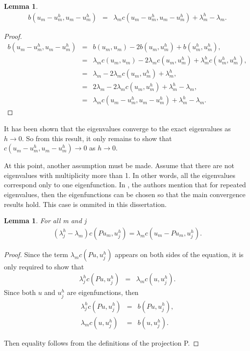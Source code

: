 \documentclass[../../main.tex]{subfiles}
\begin{document}
\newtheorem{Lem_5}[Lem_1]{Lemma} 
\begin{Lem_5}
	\label{Lem_5}
	\begin{eqnarray*}
		b(u_{m}-u_{m}^{h},u_{m}-u_{m}^{h}) &=& \lambda_{m}c( u_{m}-u_{m}^{h},u_{m}-u_{m}^{h} ) + \lambda_{m}^{h} - \lambda_{m}.
		\end{eqnarray*}
\end{Lem_5}
\begin{proof}
	\begin{eqnarray*}
		b(u_{m}-u_{m}^{h},u_{m}-u_{m}^{h}) &=& b(u_{m},u_{m}) - 2b(u_{m},u^{h}_{m}) + b(u^{h}_{m},u^{h}_{m}), \\
										&=& \lambda_{m} c( u_{m}, u_{m} ) - 2\lambda_{m} c( u_{m}, u^{h}_{m} ) + \lambda_{m}^{h}c( u_{m}^{h},u_{m}^{h} ),\\
										&=&  \lambda_{m} - 2\lambda_{m} c( u_{m}, u^{h}_{m} ) + \lambda_{m}^{h}, \\
										&=& 2\lambda_{m} - 2\lambda_{m} c( u_{m}, u^{h}_{m} ) + \lambda_{m}^{h} - \lambda_{m},\\
										&=& \lambda_{m}c( u_{m}-u_{m}^{h},u_{m}-u_{m}^{h}) + \lambda_{m}^{h} - \lambda_{m}.
		\end{eqnarray*}
\end{proof}

It has been shown that the eigenvalues converge to the exact eigenvalues as $h \rightarrow 0$. So from this result, it only remains to show that $c( u_{m}-u_{m}^{h},u_{m}-u_{m}^{h}) \rightarrow 0$ as $h \rightarrow 0$.

At this point, another assumption must be made. Assume that there are not eigenvalues with multiplicity more than 1. In other words, all the eigenvalues correspond only to one eigenfunction. In \cite{SF73}, the authors mention that for repeated eigenvalues, then the eigenfunctions can be chosen so that the main convergence results hold. This case is ommited in this dissertation.

\newtheorem{Lem_6}[Lem_1]{Lemma} 
\begin{Lem_6}
	\label{Lem_6}
	For all m and j
	\begin{eqnarray*}
	(\lambda_{j}^{h} - \lambda_{m}) c( Pu_{m}, u_{j}^{h}) = \lambda_{m} c( u_{m}-Pu_{m},u_{j}^{h} ).
	\end{eqnarray*}
\end{Lem_6}
\begin{proof}
	Since the term $\lambda_{m}c( Pu,u^{h}_{j})$ appears on both sides of the equation, it is only required to show that
	\begin{eqnarray*}
		\lambda_{j}^{h}c( Pu, u_{j}^{h} ) &=& \lambda_{m} c( u, u_{j}^{h} ).	
	\end{eqnarray*}
	Since both $u$ and $u_{j}^{h}$ are eigenfunctions, then
	\begin{eqnarray*}
		\lambda_{j}^{h}c( Pu, u_{j}^{h} ) &=& b(Pu,u_{j}^{h}),\\
		\lambda_{m} c( u, u_{j}^{h} ) &=& b(u,u_{j}^{h}).
	\end{eqnarray*}

	Then equality follows from the definitions of the projection P.
\end{proof}
\end{document}
